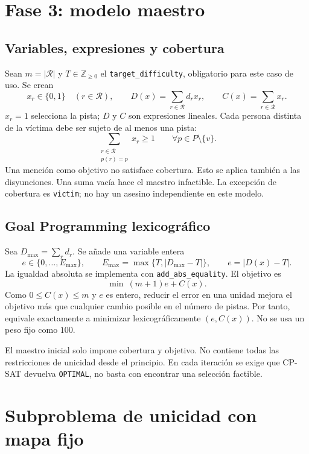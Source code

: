 \documentclass[11pt,a4paper]{article}
\newcommand{\B}{\{0,1\}}
\begin{document}
\section{Fase 3: modelo maestro}

\subsection{Variables, expresiones y cobertura}

Sean $m=|\mathcal R|$ y $T\in\mathbb Z_{\geq0}$ el
\texttt{target\_difficulty}, obligatorio para este caso de uso.
Se crean
\[
 x_r\in\B\quad(r\in\mathcal R),\qquad
 D(x)=\sum_{r\in\mathcal R}d_rx_r,\qquad
 C(x)=\sum_{r\in\mathcal R}x_r.
\]
$x_r=1$ selecciona la pista; $D$ y $C$ son expresiones lineales.
Cada persona distinta de la v\'ictima debe ser sujeto de al menos
una pista:
\[
 \sum_{\substack{r\in\mathcal R\\p(r)=p}}x_r\geq1
 \qquad\forall p\in P\setminus\{v\}.
\]
Una menci\'on como objetivo no satisface cobertura. Esto se aplica
tambi\'en a las disyunciones. Una suma vac\'ia hace el maestro
infactible. La excepci\'on de cobertura es \texttt{victim}; no hay
un asesino independiente en este modelo.

\subsection{Goal Programming lexicogr\'afico}

Sea $D_{\max}=\sum_r d_r$. Se a\~nade una variable entera
\[
 e\in\{0,\ldots,E_{\max}\},\qquad
 E_{\max}=\max\{T,|D_{\max}-T|\},\qquad
 e=|D(x)-T|.
\]
La igualdad absoluta se implementa con \texttt{add\_abs\_equality}.
El objetivo es
\[
 \boxed{\min\ (m+1)e+C(x).}
\]
Como $0\leq C(x)\leq m$ y $e$ es entero, reducir el error en una unidad
mejora el objetivo m\'as que cualquier cambio posible en el n\'umero
de pistas. Por tanto, equivale exactamente a minimizar
lexicogr\'aficamente $(e,C(x))$. No se usa un peso fijo como $100$.

El maestro inicial solo impone cobertura y objetivo. No contiene
todas las restricciones de unicidad desde el principio. En cada
iteraci\'on se exige que CP-SAT devuelva \texttt{OPTIMAL}, no basta
con encontrar una selecci\'on factible.

\section{Subproblema de unicidad con mapa fijo}
\end{document}
